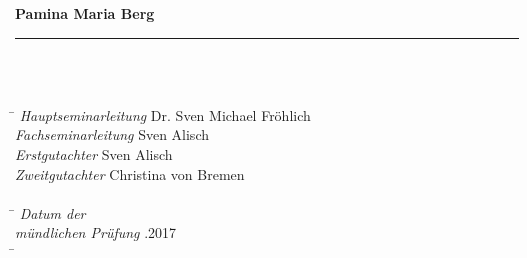\begin{titlepage}
\vspace*{15ex}
	\noindent \textbf{Pamina Maria Berg}\\
	\noindent \rule{\textwidth}{0.4mm} 
	 \\	
	 \\
\vspace*{2.5ex}
\begin{tabbing}
\hspace{10em} \=  \kill
\emph{Hauptseminarleitung} \> Dr. Sven Michael Fröhlich \\
\emph{Fachseminarleitung} \> Sven Alisch \\
\emph{Erstgutachter} \> Sven Alisch \\
\emph{Zweitgutachter} \> Christina von Bremen \\
 \> \\
 \hspace{10em} \=  \kill
\emph{Datum der} \> \\
\emph{mündlichen Prüfung} .2017 \\
 \hspace{10em} \=  \kill
\end{tabbing}

\end{titlepage}
